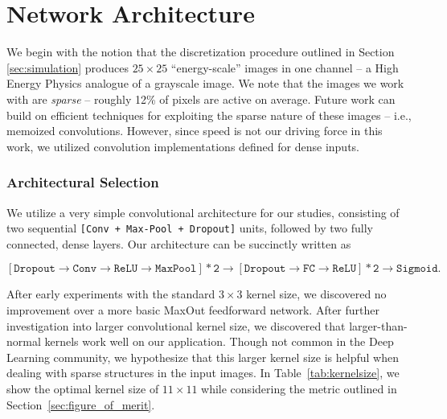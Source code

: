 
\section{Network Architecture}


We begin with the notion that the discretization procedure outlined in Section \ref{sec:simulation} produces $25\times 25$ ``energy-scale'' images in one channel -- a High Energy Physics analogue of a grayscale image. We note that the images we work with are \emph{sparse} -- roughly 12\% of pixels are active on average. Future work can build on efficient techniques for exploiting the sparse nature of these images -- i.e., memoized convolutions. However, since speed is not our driving force in this work, we utilized convolution implementations defined for dense inputs.

\subsubsection{Architectural Selection} %
\label{ssub:architectural_selection}
We utilize a very simple convolutional architecture for our studies, consisting of two sequential \texttt{[Conv + Max-Pool + Dropout]} units, followed by two fully connected, dense layers. Our architecture can be succinctly written as 

\begin{equation}
  \mathtt{[Dropout \rightarrow Conv \rightarrow ReLU \rightarrow MaxPool] * 2 \rightarrow [Dropout \rightarrow FC \rightarrow ReLU] * 2 \rightarrow Sigmoid}.
\end{equation}

After early experiments with the standard $3\times 3$ kernel size, we discovered no improvement over a more basic MaxOut \cite{maxout:goodfellow} feedforward network. After further investigation into larger convolutional kernel size, we discovered that larger-than-normal kernels work well on our application. Though not common in the Deep Learning community, we hypothesize that this larger kernel size is helpful when dealing with sparse structures in the input images. In Table~\ref{tab:kernelsize}, we show the optimal kernel size of $11\times11$ while considering the metric outlined in Section~\ref{sec:figure_of_merit}.

